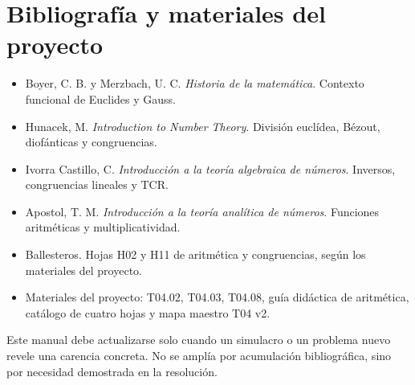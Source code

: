 \documentclass[11pt,a4paper,openany]{book}
\begin{document}
\tableofcontents
\mainmatter

























\backmatter
\chapter*{Bibliografía y materiales del proyecto}
\begin{itemize}
\item Boyer, C. B. y Merzbach, U. C. \emph{Historia de la matemática}. Contexto funcional de Euclides y Gauss.
\item Hunacek, M. \emph{Introduction to Number Theory}. División euclídea, Bézout, diofánticas y congruencias.
\item Ivorra Castillo, C. \emph{Introducción a la teoría algebraica de números}. Inversos, congruencias lineales y TCR.
\item Apostol, T. M. \emph{Introducción a la teoría analítica de números}. Funciones aritméticas y multiplicatividad.
\item Ballesteros. Hojas H02 y H11 de aritmética y congruencias, según los materiales del proyecto.
\item Materiales del proyecto: T04.02, T04.03, T04.08, guía didáctica de aritmética, catálogo de cuatro hojas y mapa maestro T04 v2.
\end{itemize}

\begin{alerta}
Este manual debe actualizarse solo cuando un simulacro o un problema nuevo revele una carencia concreta. No se amplía por acumulación bibliográfica, sino por necesidad demostrada en la resolución.
\end{alerta}
\end{document}
